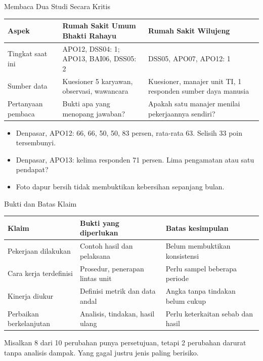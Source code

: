 \documentclass[aspectratio=169, table, 12pt]{beamer}
\begin{document}
\begin{frame}{{\Large Membaca Dua Studi Secara Kritis}}
  \vspace{2pt}
  \scriptsize
  \begin{tabularx}{\textwidth}{|>{\raggedright\arraybackslash}p{}|>{\raggedright\arraybackslash}X|>{\raggedright\arraybackslash}X|}
    \hline
    \textbf{Aspek} & \textbf{Rumah Sakit Umum Bhakti Rahayu} & \textbf{Rumah Sakit Wilujeng} \\ \hline
    Tingkat saat ini & APO12, DSS04: 1; APO13, BAI06, DSS05: 2 & DSS05, APO07, APO12: 1 \\ \hline
    Sumber data & Kuesioner 5 karyawan, observasi, wawancara & Kuesioner, manajer unit TI, 1 responden sumber daya manusia \\ \hline
    Pertanyaan pembaca & Bukti apa yang menopang jawaban? & Apakah satu manajer menilai pekerjaannya sendiri? \\ \hline
  \end{tabularx}

  \vspace{4pt}
  \small
  \begin{itemize}
    \item Denpasar, APO12: 66, 66, 50, 50, 83 persen, rata-rata 63. Selisih 33 poin tersembunyi.
    \item Denpasar, APO13: kelima responden 71 persen. Lima pengamatan atau satu pendapat?
    \item Foto dapur bersih tidak membuktikan kebersihan sepanjang bulan.
  \end{itemize}
\end{frame}

\begin{frame}{{\Large Bukti dan Batas Klaim}}
  \vspace{4pt}
  \footnotesize
  \begin{tabularx}{\textwidth}{|>{\raggedright\arraybackslash}p{}|>{\raggedright\arraybackslash}X|>{\raggedright\arraybackslash}X|}
    \hline
    \textbf{Klaim} & \textbf{Bukti yang diperlukan} & \textbf{Batas kesimpulan} \\ \hline
    Pekerjaan dilakukan & Contoh hasil dan pelaksana & Belum membuktikan konsistensi \\ \hline
    Cara kerja terdefinisi & Prosedur, penerapan lintas unit & Perlu sampel beberapa periode \\ \hline
    Kinerja diukur & Definisi metrik dan data andal & Angka tanpa tindakan belum cukup \\ \hline
    Perbaikan berkelanjutan & Analisis, tindakan, hasil ulang & Perlu keterkaitan sebab dan hasil \\ \hline
  \end{tabularx}

  \vspace{8pt}
  \small Misalkan 8 dari 10 perubahan punya persetujuan, tetapi 2 perubahan darurat tanpa analisis dampak. Yang gagal justru
  jenis paling berisiko.
\end{frame}
\end{document}
